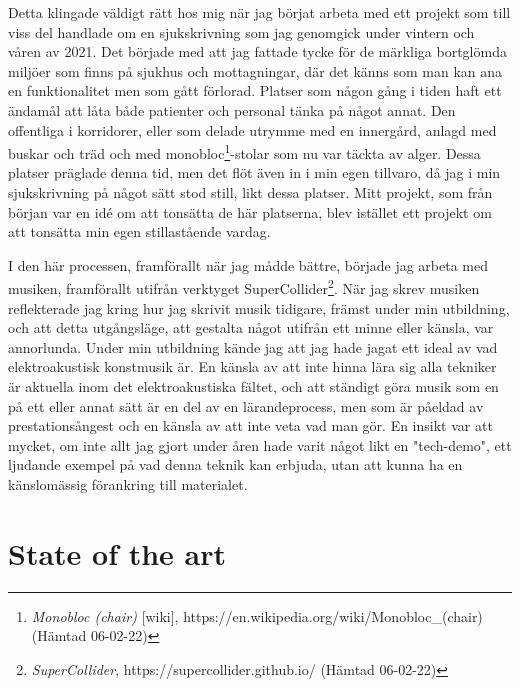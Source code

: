 \documentclass{article}
\begin{document}
Detta klingade väldigt rätt hos mig när jag börjat arbeta med ett projekt som till viss del handlade om en
sjukskrivning som jag genomgick under vintern och våren av 2021. Det började med att jag fattade tycke för de
märkliga bortglömda miljöer som finns på sjukhus och mottagningar, där det känns som man kan ana en
funktionalitet men som gått förlorad. Platser som någon gång i tiden haft ett ändamål att låta både patienter
och personal tänka på något annat. Den offentliga i korridorer, eller som delade utrymme med
en innergård, anlagd med buskar och träd och med monobloc\footnote{\emph{Monobloc
(chair)} [wiki], https://en.wikipedia.org/wiki/Monobloc\_(chair) (Hämtad 06-02-22)}-stolar som nu var täckta av
alger. Dessa platser präglade denna tid, men det flöt även in i min egen tillvaro, då jag i min sjukskrivning
på något sätt stod still, likt dessa platser. Mitt projekt, som från början var en idé om att tonsätta de här
platserna, blev istället ett projekt om att tonsätta min egen stillastående vardag. 

I den här processen, framförallt när jag mådde bättre, började jag arbeta med musiken, framförallt utifrån
verktyget SuperCollider\footnote{\emph{SuperCollider}, https://supercollider.github.io/ (Hämtad 06-02-22)}.
När jag skrev musiken reflekterade jag kring hur jag skrivit musik tidigare, främst under min utbildning, och
att detta utgångsläge, att gestalta något utifrån ett minne eller känsla, var annorlunda. Under min utbildning
kände jag att jag hade jagat ett ideal av vad elektroakustisk konstmusik är. En känsla av att inte hinna lära
sig alla tekniker är aktuella inom det elektroakustiska fältet, och att ständigt göra musik som en på ett
eller annat sätt är en del av en lärandeprocess, men som är påeldad av prestationsångest och en känsla av att
inte veta vad man gör. En insikt var att mycket, om inte allt jag gjort under åren hade varit något likt en
"tech-demo", ett ljudande exempel på vad denna teknik kan erbjuda, utan att kunna ha en känslomässig
förankring till materialet. 


\section{State of the art}
\end{document}
